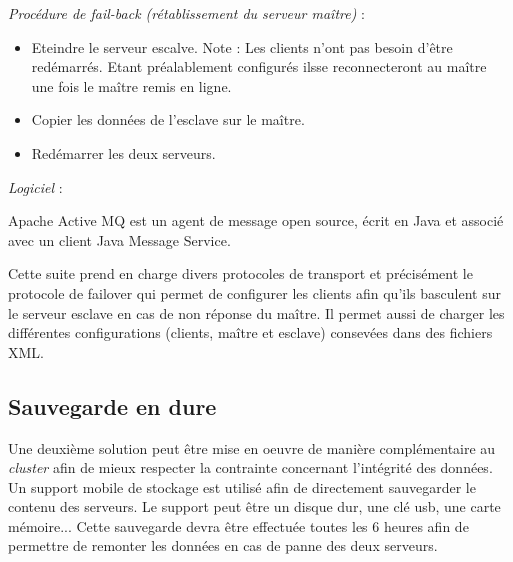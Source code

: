 \textit{Procédure de fail-back (rétablissement du serveur maître)} :
\begin{itemize}
\item Eteindre le serveur escalve.
Note : Les clients n'ont pas besoin d'être redémarrés. Etant préalablement configurés ilsse reconnecteront au maître une fois le maître remis en ligne.
\item Copier les données de l'esclave sur le maître.
\item Redémarrer les deux serveurs.
\end{itemize}


\textit{Logiciel} :

Apache Active MQ est un agent de message open source, écrit en Java et associé avec un client Java Message Service. 

Cette suite prend en charge divers protocoles de transport et précisément le protocole de failover qui permet de configurer les clients afin qu'ils basculent sur le serveur esclave en cas de non réponse du maître. 
Il permet aussi de charger les différentes configurations (clients, maître et esclave) consevées dans des fichiers XML. 

\subsection{Sauvegarde en dure}

Une deuxième solution peut être mise en oeuvre de manière complémentaire au \textit{cluster} afin de mieux respecter la contrainte concernant l'intégrité des données.
Un support mobile de stockage est utilisé afin de directement sauvegarder le contenu des serveurs. Le support peut être un disque dur, une clé usb, une carte mémoire... 
Cette sauvegarde devra être effectuée toutes les 6 heures afin de permettre de remonter les données en cas de panne des deux serveurs.  
